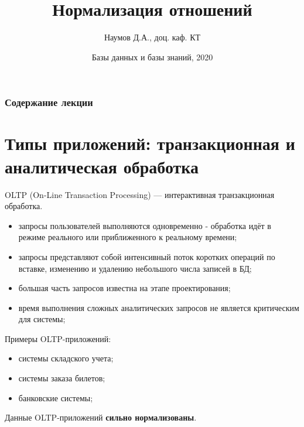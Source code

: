 \documentclass{beamer}
\title[СУБД]{Нормализация отношений}
\author{Наумов Д.А., доц. каф. КТ}
\date[14.03.2020] {Базы данных и базы знаний, 2020}
\begin{document}
\begin{frame}
  \titlepage
\end{frame}
  
\begin{frame}
  \frametitle{Содержание лекции}
  \tableofcontents  
\end{frame}
  
\section{Типы приложений: транзакционная и аналитическая обработка}
\begin{frame}
OLTP (On-Line Transaction Processing) — интерактивная транзакционная обработка.
\begin{itemize}
\item запросы пользователей выполняются одновременно - 
обработка идёт в режиме реального или приближенного к реальному времени;
\item запросы представляют собой интенсивный поток коротких операций по вставке, изменению и удалению небольшого числа записей в БД;
\item большая часть запросов известна на этапе проектирования;
\item время выполнения сложных аналитических запросов не является критическим для системы;
\end{itemize}
Примеры OLTP-приложений:
\begin{itemize}
\item системы складского учета;
\item системы заказа билетов;
\item банковские системы;
\end{itemize}
Данные OLTP-приложений \textbf{сильно нормализованы}.
\end{frame}
\end{document}
